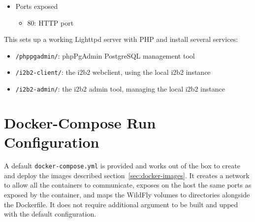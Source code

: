 \begin{itemize}
    \item Ports exposed
        \begin{itemize}
        \item 80: HTTP port
        \end{itemize}
\end{itemize}

This sets up a working Lighttpd server with PHP and install several services:
\begin{itemize}
    \item \verb|/phppgadmin/|: phpPgAdmin PostgreSQL management tool
    \item \verb|/i2b2-client/|: the i2b2 webclient, using the local i2b2 instance
    \item \verb|/i2b2-admin/|: the i2b2 admin tool, managing the local i2b2 instance
\end{itemize}


\section{Docker-Compose Run Configuration}
A default \verb|docker-compose.yml| is provided and works out of the box to create and deploy the images described section~\ref{sec:docker-images}.
It creates a network to allow all the containers to communicate, exposes on the host the same ports as exposed by the container, and maps the WildFly volumes to directories alongside the Dockerfile.
It does not require additional argument to be built and upped with the default configuration.
